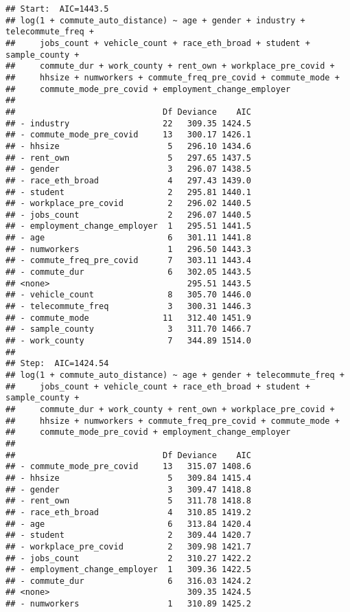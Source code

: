 \documentclass[
]{article}
\begin{document}
\begin{verbatim}
## Start:  AIC=1443.5
## log(1 + commute_auto_distance) ~ age + gender + industry + telecommute_freq + 
##     jobs_count + vehicle_count + race_eth_broad + student + sample_county + 
##     commute_dur + work_county + rent_own + workplace_pre_covid + 
##     hhsize + numworkers + commute_freq_pre_covid + commute_mode + 
##     commute_mode_pre_covid + employment_change_employer
## 
##                              Df Deviance    AIC
## - industry                   22   309.35 1424.5
## - commute_mode_pre_covid     13   300.17 1426.1
## - hhsize                      5   296.10 1434.6
## - rent_own                    5   297.65 1437.5
## - gender                      3   296.07 1438.5
## - race_eth_broad              4   297.43 1439.0
## - student                     2   295.81 1440.1
## - workplace_pre_covid         2   296.02 1440.5
## - jobs_count                  2   296.07 1440.5
## - employment_change_employer  1   295.51 1441.5
## - age                         6   301.11 1441.8
## - numworkers                  1   296.50 1443.3
## - commute_freq_pre_covid      7   303.11 1443.4
## - commute_dur                 6   302.05 1443.5
## <none>                            295.51 1443.5
## - vehicle_count               8   305.70 1446.0
## - telecommute_freq            3   300.31 1446.3
## - commute_mode               11   312.40 1451.9
## - sample_county               3   311.70 1466.7
## - work_county                 7   344.89 1514.0
## 
## Step:  AIC=1424.54
## log(1 + commute_auto_distance) ~ age + gender + telecommute_freq + 
##     jobs_count + vehicle_count + race_eth_broad + student + sample_county + 
##     commute_dur + work_county + rent_own + workplace_pre_covid + 
##     hhsize + numworkers + commute_freq_pre_covid + commute_mode + 
##     commute_mode_pre_covid + employment_change_employer
## 
##                              Df Deviance    AIC
## - commute_mode_pre_covid     13   315.07 1408.6
## - hhsize                      5   309.84 1415.4
## - gender                      3   309.47 1418.8
## - rent_own                    5   311.78 1418.8
## - race_eth_broad              4   310.85 1419.2
## - age                         6   313.84 1420.4
## - student                     2   309.44 1420.7
## - workplace_pre_covid         2   309.98 1421.7
## - jobs_count                  2   310.27 1422.2
## - employment_change_employer  1   309.36 1422.5
## - commute_dur                 6   316.03 1424.2
## <none>                            309.35 1424.5
## - numworkers                  1   310.89 1425.2

\end{verbatim}
\end{document}
